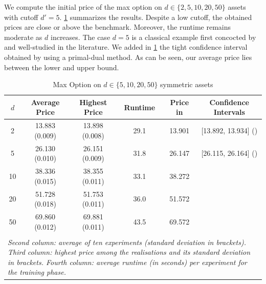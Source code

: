 We compute the initial price of the max option on $d \in\{2,5,10,20,50\}$ assets with cutoff   $d'=5$.    
 \cref{tab:symMaxOpt} summarizes the results. Despite a low cutoff, the  obtained prices are close or above the benchmark.
 Moreover, the runtime remains moderate as $d$ increases. The case $d=5$ is a classical example first concocted by \citet{BroadieGlasserman} and well-studied in the literature. We added in  \cref{tab:symMaxOpt} the tight confidence interval obtained by \citet{BroadieCao} using a primal-dual method. As can be seen, our average price lies between the lower and upper bound.

\begin{table}[ht]
\caption{Max Option on $d \in\{5,10,20,50\}$ symmetric assets}

\vspace{-2mm}
\label{tab:symMaxOpt}
  \centering
  \begin{tabular}{ c c c c c c}
 \hline  \hline
   $d$ & Average Price& Highest Price & Runtime& Price in \cite{Becker2} & Confidence Intervals \\ %
  \hline \hline
2   & 13.883 (0.009)  &  13.898 (0.008) & 29.1  & 13.901 & [13.892, 13.934] \; (\cite{AndersenBroadie}) \\
  5   & 26.130 (0.010)  & 26.151 (0.009) & 31.8  & 26.147 & [26.115, 26.164] \; (\cite{BroadieCao})\\
  10   & 38.336 (0.015) &   38.355 (0.011)& 33.1 & 38.272 &\\
    20   & 51.728 (0.018) & 51.753 (0.011)  & 36.0 & 51.572  &  \\
  50  & 69.860 (0.012) & 69.881 (0.011) & 43.5 & 69.572   &  \\
 \hline\\[-1em]
 
 \multicolumn{6}{l}{%
  \begin{minipage}{14cm}%
    \tiny \textit{Second  column:  average  of ten experiments (standard deviation in brackets). Third column: highest price  among the realisations and its standard deviation in brackets.  Fourth column:  average runtime (in seconds) per experiment for the training phase.}%
  \end{minipage}%
}
\end{tabular}

  \end{table}
  
